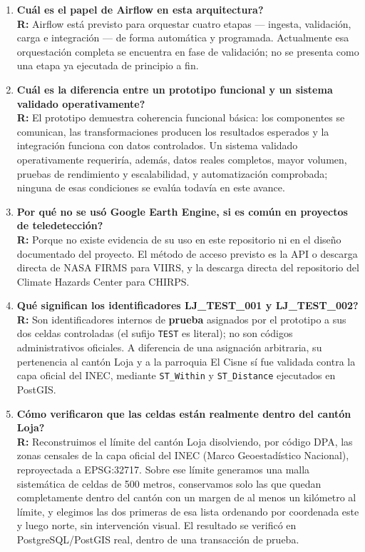 \documentclass[11pt,a4paper]{article}
\begin{document}
\begin{enumerate}[leftmargin=1.2cm, itemsep=8pt, label=\textbf{P\arabic*.}]
\item \textbf{\textquestiondown Cu\'al es el papel de Airflow en esta
arquitectura?}\\
\textbf{R:} Airflow est\'a previsto para orquestar cuatro etapas ---
ingesta, validaci\'on, carga e integraci\'on --- de forma autom\'atica
y programada. Actualmente esa orquestaci\'on completa se encuentra en
fase de validaci\'on; no se presenta como una etapa ya ejecutada de
principio a fin.

\item \textbf{\textquestiondown Cu\'al es la diferencia entre un
prototipo funcional y un sistema validado operativamente?}\\
\textbf{R:} El prototipo demuestra coherencia funcional b\'asica: los
componentes se comunican, las transformaciones producen los resultados
esperados y la integraci\'on funciona con datos controlados. Un sistema
validado operativamente requerir\'ia, adem\'as, datos reales completos,
mayor volumen, pruebas de rendimiento y escalabilidad, y automatizaci\'on
comprobada; ninguna de esas condiciones se eval\'ua todav\'ia en este
avance.

\item \textbf{\textquestiondown Por qu\'e no se us\'o Google Earth
Engine, si es com\'un en proyectos de teledetecci\'on?}\\
\textbf{R:} Porque no existe evidencia de su uso en este repositorio ni
en el dise\~no documentado del proyecto. El m\'etodo de acceso previsto
es la API o descarga directa de NASA FIRMS para VIIRS, y la descarga
directa del repositorio del Climate Hazards Center para CHIRPS.

\item \textbf{\textquestiondown Qu\'e significan los identificadores
LJ\_TEST\_001 y LJ\_TEST\_002?}\\
\textbf{R:} Son identificadores internos de \textbf{prueba} asignados
por el prototipo a sus dos celdas controladas (el sufijo \texttt{TEST}
es literal); no son c\'odigos administrativos oficiales. A diferencia
de una asignaci\'on arbitraria, su pertenencia al cant\'on Loja y a la
parroquia El Cisne s\'i fue validada contra la capa oficial del INEC,
mediante \texttt{ST\_Within} y \texttt{ST\_Distance} ejecutados en
PostGIS.

\item \textbf{\textquestiondown C\'omo verificaron que las celdas
est\'an realmente dentro del cant\'on Loja?}\\
\textbf{R:} Reconstruimos el l\'imite del cant\'on Loja disolviendo,
por c\'odigo DPA, las zonas censales de la capa oficial del INEC (Marco
Geoestad\'istico Nacional), reproyectada a EPSG:32717. Sobre ese
l\'imite generamos una malla sistem\'atica de celdas de 500 metros,
conservamos solo las que quedan completamente dentro del cant\'on con
un margen de al menos un kil\'ometro al l\'imite, y elegimos las dos
primeras de esa lista ordenando por coordenada este y luego norte, sin
intervenci\'on visual. El resultado se verific\'o en PostgreSQL/PostGIS
real, dentro de una transacci\'on de prueba.


\end{enumerate}
\end{document}
